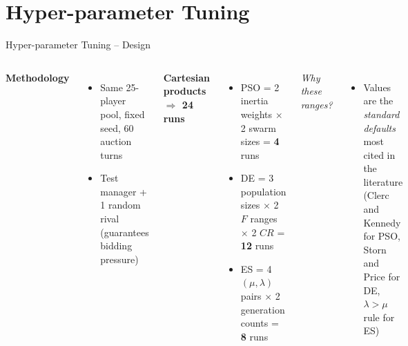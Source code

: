 \documentclass[aspectratio=169]{beamer}
\begin{document}
\section{Hyper-parameter Tuning}
\begin{frame}{Hyper-parameter Tuning – Design}
	\small
	\begin{columns}[T,onlytextwidth]
		\textbf{Methodology}
		\begin{itemize}
			\item Same 25-player pool, fixed seed, 60 auction turns
			\item Test manager + 1 random rival (guarantees bidding pressure)

		\end{itemize}
		
		\medskip
		\textbf{Cartesian products \(\Rightarrow\) 24 runs}
\begin{itemize}
	\item PSO = 2 inertia weights \(\times\) 2 swarm sizes = \textbf{4} runs
	\item DE = 3 population sizes \(\times\) 2 \(F\) ranges \(\times\) 2 \(CR\) = \textbf{12} runs
	\item ES = 4 \((\mu,\lambda)\) pairs \(\times\) 2 generation counts = \textbf{8} runs
\end{itemize}

	

\vspace{0.4em}
\textit{Why these ranges?}
\begin{itemize}
	\item Values are the \emph{standard defaults} most cited in the literature  
	(Clerc and Kennedy for PSO, Storn and Price for DE, \(\lambda\!>\!\!\mu\) rule for ES)

	
\end{itemize}
	\end{columns}
\end{frame}
\end{document}
